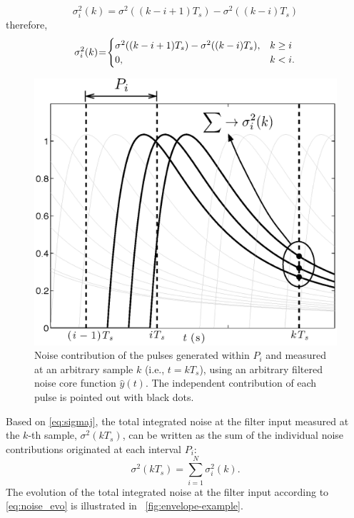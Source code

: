 \begin{equation}
		\sigma_i^2(k) = \sigma^2\left(\left(k-i+1\right)T_s\right)-\sigma^2\left(\left(k-i\right)T_s\right) 
		\label{eq:ap4}
\end{equation}
therefore,
\begin{equation}
  \sigma_i^2(k) \hspace{-0.2em}=\hspace{-0.2em} 
  \begin{cases}
     \sigma^2((k-i+1)T_s)-\sigma^2((k-i)T_s ), & k \geq i   \\
      0, &   k < i.
  \end{cases}\label{eq:sigmaj}
\end{equation}

\begin{figure}[!t]
	\centering
	\includegraphics[width=4.5in]{./Figures/sequence.eps}
	\caption{Noise contribution of the pulses generated within $P_i$ and measured at an arbitrary sample $k$ (i.e., $t=kT_s$), using an arbitrary filtered noise core function $\hat{y}(t)$. The independent contribution of each pulse is pointed out with black dots.}\label{fig:sequence}
\end{figure}

Based on \eqref{eq:sigmaj}, the total integrated noise at the filter input measured at the \mbox{$k$-th} sample, $\sigma^2(kT_s)$, can be written as the sum of the individual noise contributions originated at each interval $P_i$:
\begin{equation}
\sigma^2(kT_s) = \sum_{i=1}^{N} \sigma_i^2(k). \label{eq:noise_evo}
\end{equation}
The evolution of the total integrated noise at the filter input according to \eqref{eq:noise_evo} is illustrated in \figurename~\ref{fig:envelope-example}. 

